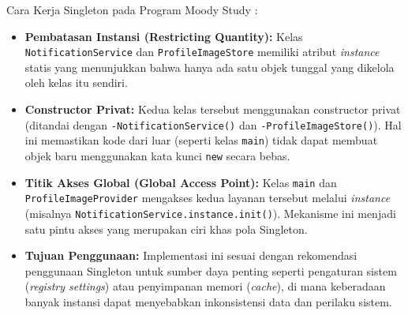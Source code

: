 \documentclass[11pt]{article}
\begin{document}
Cara Kerja Singleton pada Program Moody Study :
\begin{itemize}
    \item \textbf{Pembatasan Instansi (Restricting Quantity):} Kelas \texttt{NotificationService} dan \texttt{ProfileImageStore} memiliki atribut \textit{instance} statis yang menunjukkan bahwa hanya ada satu objek tunggal yang dikelola oleh kelas itu sendiri.

    \item \textbf{Constructor Privat:} Kedua kelas tersebut menggunakan constructor privat (ditandai dengan \texttt{-NotificationService()} dan \texttt{-ProfileImageStore()}). Hal ini memastikan kode dari luar (seperti kelas \texttt{main}) tidak dapat membuat objek baru menggunakan kata kunci \texttt{new} secara bebas.

    \item \textbf{Titik Akses Global (Global Access Point):} Kelas \texttt{main} dan \texttt{ProfileImageProvider} mengakses kedua layanan tersebut melalui \textit{instance} (misalnya \texttt{NotificationService.instance.init()}). Mekanisme ini menjadi satu pintu akses yang merupakan ciri khas pola Singleton.

    \item \textbf{Tujuan Penggunaan:} Implementasi ini sesuai dengan rekomendasi penggunaan Singleton untuk sumber daya penting seperti pengaturan sistem (\textit{registry settings}) atau penyimpanan memori (\textit{cache}), di mana keberadaan banyak instansi dapat menyebabkan inkonsistensi data dan perilaku sistem.
\end{itemize}
\end{document}
